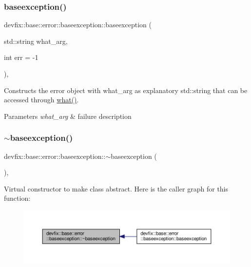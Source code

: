 \subsubsection{\texorpdfstring{baseexception()}{baseexception()}\hspace{0.1cm}{\footnotesize\ttfamily [2/2]}}
{\footnotesize\ttfamily devfix\+::base\+::error\+::baseexception\+::baseexception (\begin{DoxyParamCaption}\item[{std\+::string}]{what\+\_\+arg,  }\item[{int}]{err = {\ttfamily -\/1} }\end{DoxyParamCaption})\hspace{0.3cm}{\ttfamily [inline]}, {\ttfamily [explicit]}}

Constructs the error object with what\+\_\+arg as explanatory std\+::string that can be accessed through \hyperlink{structdevfix_1_1base_1_1error_1_1baseexception_a16327152a55d65b1e537825231fbd452}{what()}. 
\begin{DoxyParams}{Parameters}
{\em what\+\_\+arg} & failure description \\
\hline
\end{DoxyParams}
\mbox{\label{structdevfix_1_1base_1_1error_1_1baseexception_a3ae67c736d3268683cb92556c9f14bd7}} 
\subsubsection{\texorpdfstring{$\sim$baseexception()}{~baseexception()}}
{\footnotesize\ttfamily devfix\+::base\+::error\+::baseexception\+::$\sim$baseexception (\begin{DoxyParamCaption}{ }\end{DoxyParamCaption})\hspace{0.3cm}{\ttfamily [override]}, {\ttfamily [default]}}

Virtual constructor to make class abstract. Here is the caller graph for this function\+:\nopagebreak
\begin{figure}[H]
\begin{center}
\leavevmode
\includegraphics[width=350pt]{structdevfix_1_1base_1_1error_1_1baseexception_a3ae67c736d3268683cb92556c9f14bd7_icgraph}
\end{center}
\end{figure}


